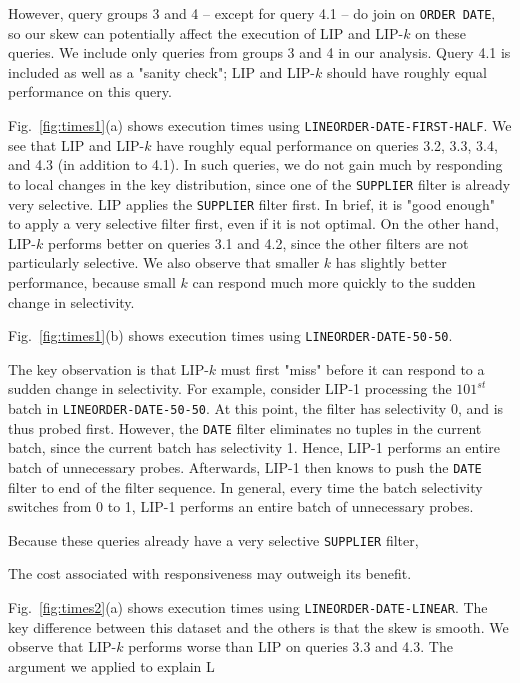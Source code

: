 However, query groups 3 and 4 -- except for query 4.1 -- do join on \texttt{ORDER DATE}, so our skew can potentially affect the execution of LIP and LIP-$k$ on these queries.
We include only queries from groups 3 and 4 in our analysis. 
Query 4.1 is included as well as a "sanity check"; LIP and LIP-$k$ should have roughly equal performance on this query.

Fig.~\ref{fig:times1}(a) shows execution times using \texttt{LINEORDER-DATE-FIRST-HALF}. 
We see that LIP and LIP-$k$ have roughly equal performance on queries 3.2, 3.3, 3.4, and 4.3 (in addition to 4.1).
In such queries, we do not gain much by responding to local changes in the key distribution,
since one of the \texttt{SUPPLIER} filter is already very selective. 
LIP applies the \texttt{SUPPLIER} filter first.
In brief, it is "good enough" to apply a very selective filter first, even if it is not optimal.
On the other hand, LIP-$k$ performs better on queries 3.1 and 4.2, 
since the other filters are not particularly selective. 
We also observe that smaller $k$ has slightly better performance, 
because small $k$ can respond much more quickly to the sudden change in selectivity.

Fig.~\ref{fig:times1}(b) shows execution times using \texttt{LINEORDER-DATE-50-50}. 

The key observation is that LIP-$k$ must first "miss" before it can respond to a sudden change in selectivity.
For example, consider LIP-1 processing the $101^{st}$ batch in \texttt{LINEORDER-DATE-50-50}. 
At this point, the  filter has selectivity 0, and is thus probed first. 
However, the \texttt{DATE} filter eliminates no tuples in the current batch, since the current batch has selectivity 1.
Hence, LIP-1 performs an entire batch of unnecessary probes. 
Afterwards, LIP-1 then knows to push the \texttt{DATE} filter to end of the filter sequence. 
In general, every time the batch selectivity switches from 0 to 1, 
LIP-1 performs an entire batch of unnecessary probes. 

Because these queries already have a very selective \texttt{SUPPLIER} filter, 

The cost associated with responsiveness may outweigh its benefit. 

Fig.~\ref{fig:times2}(a) shows execution times using \texttt{LINEORDER-DATE-LINEAR}. 
The key difference between this dataset and the others is that the skew is smooth. 
We observe that LIP-$k$ performs worse than LIP on queries 3.3 and 4.3. 
The argument we applied to explain L

